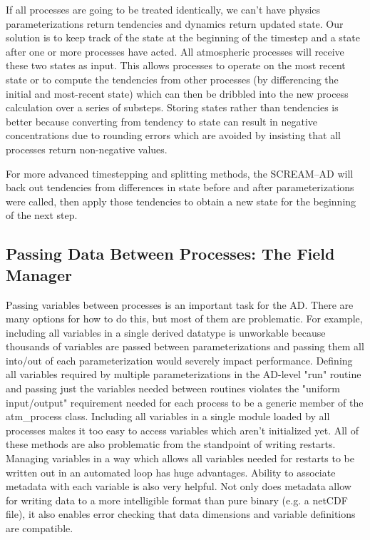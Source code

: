 If all processes are going to be treated identically, we can't have physics parameterizations return tendencies and dynamics return updated state. Our solution is to keep track of the state at the beginning of the timestep and a state after one or more processes have acted. All atmospheric processes will receive these two states as input. This allows processes to operate on the most recent state or to compute the tendencies from other processes (by differencing the initial and most-recent state) which can then be dribbled into the new process calculation over a series of substeps. Storing states rather than tendencies is better because converting from tendency to state can result in negative concentrations due to rounding errors which are avoided by insisting that all processes return non-negative values. 

For more advanced timestepping and splitting methods, the SCREAM--AD will back out tendencies from differences in state before and after parameterizations were called, then apply those tendencies to obtain a new state for the beginning of the next step.  

\subsection{Passing Data Between Processes: The Field Manager}
\label{sec:FM}

Passing variables between processes is an important task for the AD. There are many options for how to do this, but most of them are problematic. For example, including all variables in a single derived datatype is unworkable because thousands of variables are passed between parameterizations and passing them all into/out of each parameterization would severely impact performance. Defining all variables required by multiple parameterizations in the AD-level "run" routine and passing just the variables needed between routines violates the "uniform input/output" requirement needed for each process to be a generic member of the atm\_process class. Including all variables in a single module loaded by all processes makes it too easy to access variables which aren't initialized yet. All of these methods are also problematic from the standpoint of writing restarts. Managing variables in a way which allows all variables needed for restarts to be written out in an automated loop has huge advantages. Ability to associate metadata with each variable is also very helpful. Not only does metadata allow for writing data to a more intelligible format than pure binary (e.g. a netCDF file), it also enables error checking that data dimensions and variable definitions are compatible.

